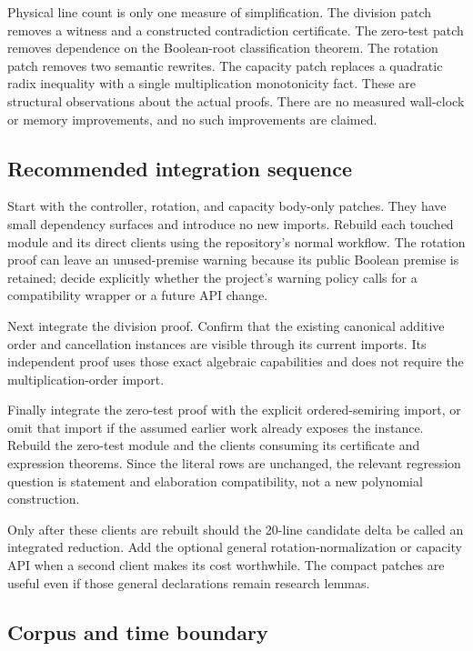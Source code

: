\documentclass[11pt,letterpaper]{article}
\begin{document}
Physical line count is only one measure of simplification. The division patch removes a witness and a constructed contradiction certificate. The zero-test patch removes dependence on the Boolean-root classification theorem. The rotation patch removes two semantic rewrites. The capacity patch replaces a quadratic radix inequality with a single multiplication monotonicity fact. These are structural observations about the actual proofs. There are no measured wall-clock or memory improvements, and no such improvements are claimed.

\subsection{Recommended integration sequence}

Start with the controller, rotation, and capacity body-only patches. They have small dependency surfaces and introduce no new imports. Rebuild each touched module and its direct clients using the repository's normal workflow. The rotation proof can leave an unused-premise warning because its public Boolean premise is retained; decide explicitly whether the project's warning policy calls for a compatibility wrapper or a future API change.

Next integrate the division proof. Confirm that the existing canonical additive order and cancellation instances are visible through its current imports. Its independent proof uses those exact algebraic capabilities and does not require the multiplication-order import.

Finally integrate the zero-test proof with the explicit ordered-semiring import, or omit that import if the assumed earlier work already exposes the instance. Rebuild the zero-test module and the clients consuming its certificate and expression theorems. Since the literal rows are unchanged, the relevant regression question is statement and elaboration compatibility, not a new polynomial construction.

Only after these clients are rebuilt should the 20-line candidate delta be called an integrated reduction. Add the optional general rotation-normalization or capacity API when a second client makes its cost worthwhile. The compact patches are useful even if those general declarations remain research lemmas.

\subsection{Corpus and time boundary}
\end{document}
